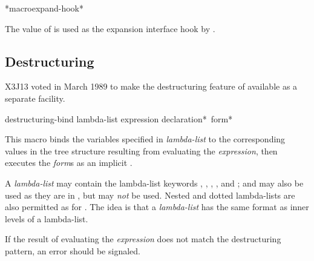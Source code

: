 \begin{defun}[Variable]
*macroexpand-hook*

The value of  is used as the expansion
interface hook by .
\end{defun}

\begin{newer}
\section{Destructuring}

X3J13 voted in March 1989 
to make the destructuring feature of 
available as a separate facility.

\begin{defmac}
destructuring-bind lambda-list expression {declaration}* {\,form}*

   This macro binds the variables specified in {\it lambda-list} to the corresponding
   values in the tree structure resulting from evaluating the {\it expression},
   then executes the {\it form\/}s as an implicit .

A  {\it lambda-list} may contain
the lambda-list keywords , , ,
, and ;  and 
may also be used as they are in , but  may
{\it not} be used.  Nested and dotted lambda-lists are also permitted
as for .
The idea is that a  {\it lambda-list}
has the same format as inner levels of a  lambda-list.

   If the result of evaluating the {\it expression} does not match the 
   destructuring pattern, an error should be signaled.
\end{defmac}
\end{newer}



